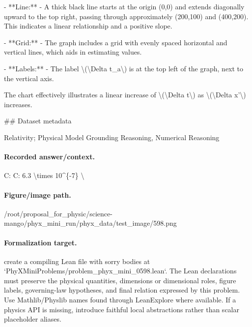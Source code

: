 - **Line:**
  - A thick black line starts at the origin (0,0) and extends diagonally upward to the top right, passing through approximately (200,100) and (400,200). This indicates a linear relationship and a positive slope.

- **Grid:**
  - The graph includes a grid with evenly spaced horizontal and vertical lines, which aids in estimating values.

- **Labels:**
  - The label \textbackslash{}(\textbackslash{}Delta t\_a\textbackslash{}) is at the top left of the graph, next to the vertical axis.

The chart effectively illustrates a linear increase of \textbackslash{}(\textbackslash{}Delta t\textbackslash{}) as \textbackslash{}(\textbackslash{}Delta x'\textbackslash{}) increases.

\#\# Dataset metadata

Relativity; Physical Model Grounding Reasoning, Numerical Reasoning

\paragraph{Recorded answer/context.}
C: C: 6.3 \textbackslash{}times 10\textasciicircum{}\{-7\} \textbackslash{}

\paragraph{Figure/image path.}
/root/proposal\_for\_physic/science-mango/phyx\_mini\_run/phyx\_data/test\_image/598.png

\paragraph{Formalization target.}
create a compiling Lean file with sorry bodies at `PhyXMiniProblems/problem\_phyx\_mini\_0598.lean`. The Lean declarations must preserve the physical quantities, dimensions or dimensional roles, figure labels, governing-law hypotheses, and final relation expressed by this problem.
Use Mathlib/Physlib names found through LeanExplore where available. If a physics API is missing, introduce faithful local abstractions rather than scalar placeholder aliases.

